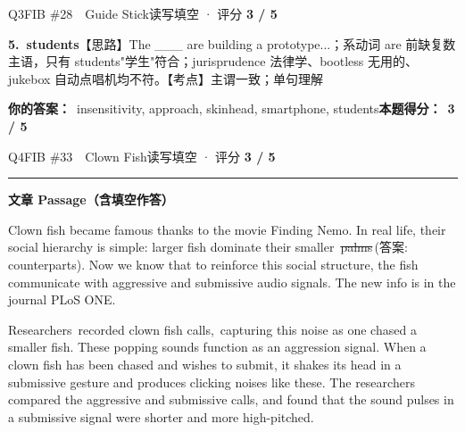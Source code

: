 \documentclass[11pt]{article}
\newcommand{\ptesub}[1]{%
  \par\needspace{2\baselineskip}\smallskip
  {\color{cAccent}\rule[-0.2ex]{3pt}{1.05em}}\hspace{6pt}%
  {\bfseries\color{cHead}#1}\par\nopagebreak\smallskip}
\newcommand{\rok}[1]{{\color{cFix}\ding{51}\,#1}}                 %
\newcommand{\rno}[2]{{\color{cWrong}\ding{55}\,\sout{#1}}\,{\footnotesize\color{cFix}(答案:\,#2)}}  %
\begin{document}
\begin{qblock}{Q3\quad FIB \#28\ \ Guide Stick}{读写填空 · 评分 \textcolor{cAccent}{\bfseries 3 / 5}}
\begin{notebox}
\textbf{5.\ students}\quad【思路】The \_\_\_ are building a prototype...；系动词 are 前缺复数主语，只有 students"学生"符合；jurisprudence 法律学、bootless 无用的、jukebox 自动点唱机均不符。【考点】主谓一致；单句理解
\end{notebox}
\smallskip
\textbf{你的答案：}\ {\color{cWrong}insensitivity}, approach, {\color{cWrong}skinhead}, smartphone, students\qquad\textbf{本题得分：}\ {\color{cAccent}\bfseries 3 / 5}
\end{qblock}

\begin{qblock}{Q4\quad FIB \#33\ \ Clown Fish}{读写填空 · 评分 \textcolor{cAccent}{\bfseries 3 / 5}}
\ptesub{文章 Passage（含填空作答）}
\begin{promptbox}
Clown fish became famous thanks to the movie Finding Nemo. In real life, their social hierarchy is simple: larger fish dominate their smaller \rno{palms}{counterparts}. Now we know that to reinforce this social structure, the fish communicate with aggressive and submissive audio signals. The new info is in the journal PLoS ONE.

Researchers \rok{recorded} clown fish calls, \rok{capturing} this noise as one chased a smaller fish. These popping sounds function as an aggression signal. When a clown fish has been chased and wishes to submit, it shakes its head in a submissive gesture and produces clicking noises like these. The researchers \rok{compared} the aggressive and submissive calls, and found that the sound pulses in a submissive signal were shorter and more high-pitched.


\end{promptbox}
\end{qblock}
\end{document}
